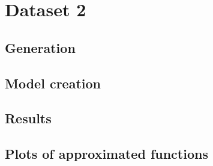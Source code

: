 \documentclass{article}
\begin{document}
\section{Dataset 2}

\subsection{Generation}

\subsection{Model creation}
\subsection{Results}

\subsection{Plots of approximated functions}
\end{document}

